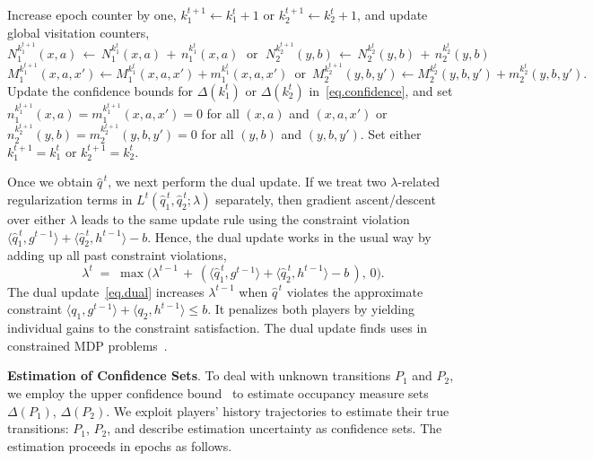 \documentclass[12pt, final]{l4dc2023}
\begin{document}
\begin{algorithm}[t]
\begin{algorithmic}[1]
		\STATE Increase epoch counter by one, $k_1^{t+1} \leftarrow k_1^t+1$ or $k_2^{t+1} \leftarrow k_2^t+1$, and update global visitation counters,
		\[
		N_1^{k_1^{t+1}} (x,a) \,\leftarrow\, N_1^{k_1^t} (x,a)\,+\,n_1^{k_1^t}(x,a)
		\; \text{ or } \;
		N_2^{k_2^{t+1}} (y,b) \,\leftarrow\, N_2^{k_2^t} (y,b)\,+\,n_2^{k_2^t}(y,b)
		\]
		\[
		\!\!\!\!  \!\!\!\!  \!\!\!\!  \!\!\!\!  \!\!\!\!
		M_1^{k_1^{t+1}}\! (x,a,x') \leftarrow M_1^{k_1^t}\! (x,a,x') + m_1^{k_1^t}(x,a,x')
		\,	\text{ or } \,
		M_2^{k_2^{t+1}}\! (y,b,y') \leftarrow M_2^{k_2^t}\! (y,b,y') + m_2^{k_2^t}(y,b,y').
		\]
		Update the confidence bounds for $\Delta(k_1^t)$ or $\Delta(k_2^t)$ in~\eqref{eq.confidence}, and set $n_1^{k_1^{t+1}}(x,a) = m_1^{k_1^{t+1}}(x,a,x') = 0$ for all $(x,a)$ and $(x,a,x')$ or $n_2^{k_2^{t+1}}(y,b) = m_2^{k_2^{t+1}}(y,b,y') = 0$ for all $(y,b)$ and $(y,b,y')$.
		\ELSE
		\STATE Set either $k_1^{t+1} = k_1^{t}$ or $k_2^{t+1} = k_2^{t}$.
		\ENDIF
		
		\ENDFOR
	\end{algorithmic}
\end{algorithm}

Once we obtain $\hat q^{\,t}$, we next perform the dual update. If we treat two $\lambda$-related regularization terms in $L^t(\hat q_1^{\,t}, \hat q_2^{\,t};\lambda)$ separately, then gradient ascent/descent over either $\lambda$ leads to the same update rule using the constraint violation $\langle{\hat q_1^{\,t}},{g^{t-1}}\rangle +\langle{\hat q_2^{\,t}},{h^{t-1}}\rangle-b$. Hence, the dual update works in the usual way by adding up all past constraint violations,
\begin{equation}\label{eq.dual}
\lambda^{t} \;=\; \max \big( \lambda^{t-1} \,+\, (\langle{\hat q_1^{\,t}},{g^{t-1}}\rangle +\langle{\hat q_2^{\,t}},{h^{t-1}}\rangle-b\, ),\, 0 \big).
\end{equation}
The dual update~\eqref{eq.dual} increases $\lambda^{t-1}$ when $\hat q^{\,t}$ violates the approximate constraint $\langle{q_1},{g^{t-1}}\rangle +\langle{q_2},{h^{t-1}}\rangle\leq b$. It penalizes both players by yielding individual gains to the constraint satisfaction. The dual update finds uses in constrained MDP problems~\citep{efroni2020exploration,ding2020provably}. 

\noindent\textbf{Estimation of Confidence Sets}. To deal with unknown transitions $P_1$ and $P_2$, we employ the upper confidence bound~\citep{jaksch2010near,neu2010online} to estimate occupancy measure sets $\Delta(P_1)$, $\Delta(P_2)$. We exploit players' history trajectories to estimate their true transitions: $P_1$, $P_2$, and describe estimation uncertainty as confidence sets. The estimation proceeds in epochs as follows.
\end{document}
